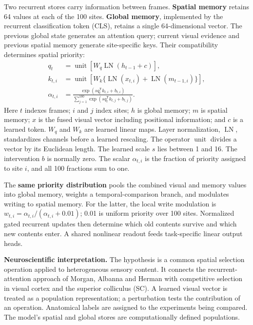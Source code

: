 \documentclass[11pt,letterpaper]{article}
\begin{document}
Two recurrent stores carry information between frames. \textbf{Spatial memory} retains 64 values at each of the 100 sites. \textbf{Global memory}, implemented by the recurrent classification token (CLS), retains a single 64-dimensional vector. The previous global state generates an attention query; current visual evidence and previous spatial memory generate site-specific keys. Their compatibility determines spatial priority:
\begin{align}
 q_t &= \operatorname{unit}\!\left[W_q\operatorname{LN}(h_{t-1}+c)\right],\\
 k_{t,i} &= \operatorname{unit}\!\left[W_k\{\operatorname{LN}(x_{t,i})+\operatorname{LN}(m_{t-1,i})\}\right],\\
 \alpha_{t,i} &= \frac{\exp(s q_t^\mathsf{T}k_{t,i}+b_{t,i})}
 {\sum_{j=1}^{100}\exp(s q_t^\mathsf{T}k_{t,j}+b_{t,j})}.
\end{align}
Here $t$ indexes frames; $i$ and $j$ index sites; $h$ is global memory; $m$ is spatial memory; $x$ is the fused visual vector including positional information; and $c$ is a learned token. $W_q$ and $W_k$ are learned linear maps. Layer normalization, $\operatorname{LN}$, standardizes channels before a learned rescaling. The operator $\operatorname{unit}$ divides a vector by its Euclidean length. The learned scale $s$ lies between 1 and 16. The intervention $b$ is normally zero. The scalar $\alpha_{t,i}$ is the fraction of priority assigned to site $i$, and all 100 fractions sum to one.

The \textbf{same priority distribution} pools the combined visual and memory values into global memory, weights a temporal-comparison branch, and modulates writing to spatial memory. For the latter, the local write modulation is $w_{t,i}=\alpha_{t,i}/(\alpha_{t,i}+0.01)$; 0.01 is uniform priority over 100 sites. Normalized gated recurrent updates then determine which old contents survive and which new contents enter. A shared nonlinear readout feeds task-specific linear output heads.

\textbf{Neuroscientific interpretation.} The hypothesis is a common spatial selection operation applied to heterogeneous sensory content. It connects the recurrent-attention approach of Morgan, Albanna and Herman \cite{morgan} with competitive selection in visual cortex and the superior colliculus (SC). A learned visual vector is treated as a population representation; a perturbation tests the contribution of an operation. Anatomical labels are assigned to the experiments being compared. The model's spatial and global stores are computationally defined populations.
\end{document}
